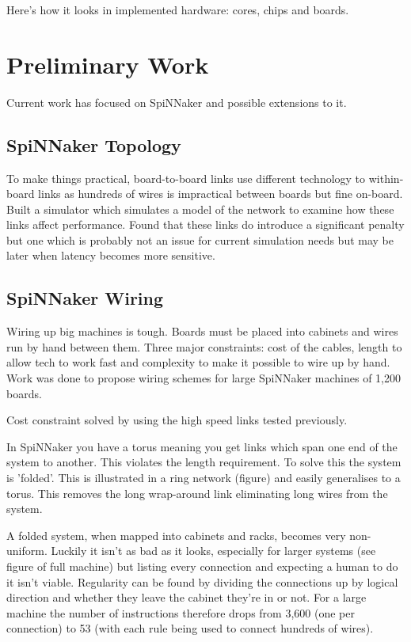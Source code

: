 Here's how it looks in implemented hardware: cores, chips and boards.

\section{Preliminary Work}

Current work has focused on SpiNNaker and possible extensions to it.

\subsection{SpiNNaker Topology}

To make things practical, board-to-board links use different technology to
within-board links as hundreds of wires is impractical between boards but fine
on-board. Built a simulator which simulates a model of the network to examine
how these links affect performance. Found that these links do introduce a
significant penalty but one which is probably not an issue for current
simulation needs but may be later when latency becomes more sensitive.

\subsection{SpiNNaker Wiring}

Wiring up big machines is tough. Boards must be placed into cabinets and wires
run by hand between them. Three major constraints: cost of the cables, length to
allow tech to work fast and complexity to make it possible to wire up by hand.
Work was done to propose wiring schemes for large SpiNNaker machines of 1,200
boards.

Cost constraint solved by using the high speed links tested previously.

In SpiNNaker you have a torus meaning you get links which span one end of the
system to another. This violates the length requirement. To solve this the
system is 'folded'. This is illustrated in a ring network (figure) and easily
generalises to a torus. This removes the long wrap-around link eliminating long
wires from the system.

A folded system, when mapped into cabinets and racks, becomes very non-uniform.
Luckily it isn't as bad as it looks, especially for larger systems (see figure
of full machine) but listing every connection and expecting a human to do it
isn't viable. Regularity can be found by dividing the connections up by logical
direction and whether they leave the cabinet they're in or not. For a large
machine the number of instructions therefore drops from 3,600 (one per
connection) to 53 (with each rule being used to connect hundreds of wires).

